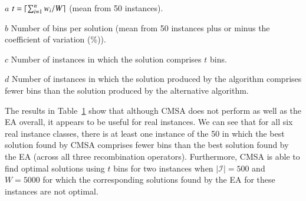 \documentclass[authoryear]{elsarticle}
\begin{document}
\begin{table}[h!]
\begin{threeparttable}
\begin{tabular}{crrcrrrcrrr}
	\bottomrule
\end{tabular}
\vspace{0.2cm} %
\begin{tablenotes}
	\scriptsize
	\item[$a$] $t = \lceil\sum_{i=1}^{n} w_i / W\rceil$ (mean from 50 instances).
	\item[$b$] Number of bins per solution (mean from 50 instances plus or minus the coefficient of variation (\%)).
	\item[$c$] Number of instances in which the solution comprises $t$ bins.
	\item[$d$] Number of instances in which the solution produced by the algorithm comprises fewer bins than the solution produced by the alternative algorithm.
\end{tablenotes}	
\end{threeparttable}	
\label{table:cmsa}
\end{table}


\noindent The results in Table~\ref{table:cmsa} show that although CMSA does not perform as well as the EA overall, it appears to be useful for real instances. We can see that for all six real instance classes, there is at least one instance of the 50 in which the best solution found by CMSA comprises fewer bins than the best solution found by the EA (across all three recombination operators). Furthermore, CMSA is able to find optimal solutions using $t$ bins for two instances when $|\mathcal{I}| = 500$ and $W = 5000$ for which the corresponding solutions found by the EA for these instances are not optimal. 
\end{document}
